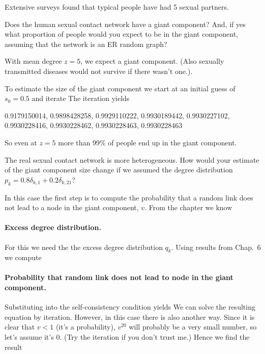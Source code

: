 Extensive surveys found that typical people have had 5 sexual partners. 

\subquestion Does the human sexual contact network have a giant component? And, if yes what proportion of people would you expect to be in the giant component, assuming that the network is an ER random graph? 

\solution
With mean degree $z=5$, we expect a giant component. (Also sexually transmitted diseases would not survive if there wasn't one.). 

To estimate the size of the giant component we start at an initial guess of $s_0=0.5$ and iterate 
The iteration yields 
\begin{center}
0.9179150014,
0.9898428258,
0.9929110222,
0.9930189442,
0.9930227102,
0.9930228416,
0.9930228462,
0.9930228463,
0.9930228463
\end{center}
So even at $z=5$ more than 99\% of people end up in the giant component. 

\subquestion 
The real sexual contact network is more heterogeneous. How would your estimate of the giant component size change if we assumed the degree distribution $p_k=0.8 \delta_{k,1} + 0.2 \delta_{k,21}$?


\solution
In this case the first step is to compute the probability that a random link does not lead to a node in the giant component, $v$. From the chapter we know 
\paragraph{Excess degree distribution.}For this we need the the excess degree distribution $q_k$. 
Using results from Chap.~6 we compute
\paragraph{Probability that random link does not lead to node in the giant component.}Substituting into the self-consistency condition yields
We can solve the resulting equation 
by iteration. However, in this case there is also another way. Since it is clear that $v<1$ (it's a probability), $v^{20}$ will probably be a very small number, so let's assume it's 0. (Try the iteration if you don't trust me.) Hence we find the result 
